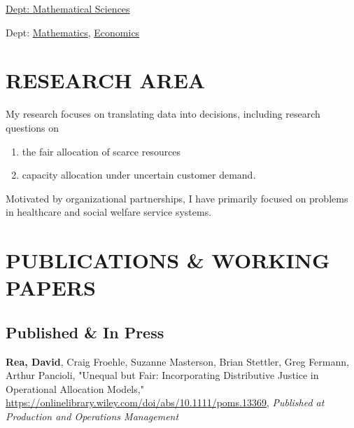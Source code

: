 \documentclass[12pt, letter]{moderncv}
\begin{document}
{\hspace*{.35in}\href{https://www.clemson.edu/science/departments/math-stat/}{ Dept: Mathematical Sciences}}{}{}


{\hspace*{.35in} Dept: \href{https://www.wittenberg.edu/academics/math}{Mathematics}, \href{https://www.wittenberg.edu/academics/economics}{Economics}}{}{}{}

\smallskip
\section{RESEARCH AREA}
\smallskip
My research focuses on translating data into decisions, including research questions on
\smallskip 
\begin{enumerate}[\hspace{0.5cm}(1)]
	\item the fair allocation of scarce resources
	\item capacity allocation under uncertain customer demand.
\end{enumerate}
Motivated by organizational partnerships, I have primarily focused on problems in healthcare and social welfare service systems.
\smallskip
\section{PUBLICATIONS \& WORKING PAPERS}
\smallskip
\subsection{Published \& In Press}
\smallskip
\textbf{Rea, David}, Craig Froehle, Suzanne Masterson, Brian Stettler, Greg Fermann, Arthur Pancioli, "Unequal but Fair: Incorporating Distributive Justice in Operational Allocation Models," \url{https://onlinelibrary.wiley.com/doi/abs/10.1111/poms.13369},\newline
\textit{Published at Production and Operations Management}\\
\end{document}
